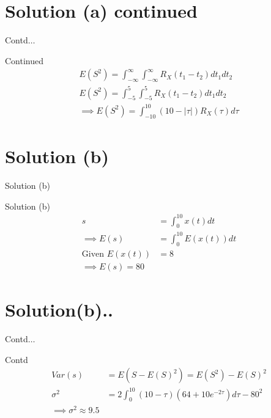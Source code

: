 \documentclass{beamer}
\providecommand{\abs}[1]{\left\vert#1\right\vert}
\begin{document}
    \section{Solution (a) continued}
    \begin{frame}{Contd$\ldots$}
        \begin{block}{Continued}
        \begin{align}
            E(S^2)=\int_{-\infty}^{\infty}\int_{-\infty}^{\infty} R_X(t_1-t_2)dt_1 dt_2\\
            E(S^2)=\int_{-5}^{5}\int_{-5}^{5}R_X(t_1-t_2)dt_1 dt_2\\
            \implies\boxed{E(S^2)=\int_{-10}^{10}(10-\abs{\tau})R_X(\tau)d\tau}
        \end{align}
        \end{block}
    \end{frame}
    \section{Solution (b)}
    \begin{frame}{Solution (b)}
        \begin{block}{Solution (b)}
        \begin{align}
        s&=\int_0^{10}x(t)dt\\
        \implies E(s)&=\int_0^{10}E(x(t))dt\\
        \text{Given }E(x(t))&=8\\
        \implies \boxed{E(s)=80}
        \end{align}
        \end{block}
    \end{frame}
    \section{Solution(b)..}
    \begin{frame}{Contd$\ldots$}
        \begin{block}{Contd}
    \begin{align}
        Var(s)&=E(S-E(S)^2)=E(S^2)-E(S)^2\\
        \sigma^2&=2\int_0^{10}(10-\tau)(64+10e^{-2\tau})d\tau-80^2\\
        \implies \boxed{\sigma^2\approx9.5}
    \end{align}
        \end{block}
    \end{frame}
    
\end{document}
